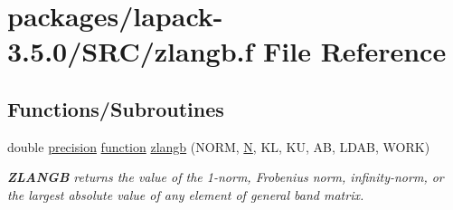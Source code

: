 \hypertarget{zlangb_8f}{}\section{packages/lapack-\/3.5.0/\+S\+R\+C/zlangb.f File Reference}
\label{zlangb_8f}
\subsection*{Functions/\+Subroutines}
\begin{DoxyCompactItemize}
\item 
double \hyperlink{numinquire_8h_a2c8e616467665d0b2814d4c1589ba74e}{precision} \hyperlink{afunc_8m_a7b5e596df91eadea6c537c0825e894a7}{function} \hyperlink{group__complex16GBauxiliary_gad6a0255b5203b49d0f7828f0e03522aa}{zlangb} (N\+O\+R\+M, \hyperlink{polmisc_8c_a0240ac851181b84ac374872dc5434ee4}{N}, K\+L, K\+U, A\+B, L\+D\+A\+B, W\+O\+R\+K)
\begin{DoxyCompactList}\small\item\em {\bfseries Z\+L\+A\+N\+G\+B} returns the value of the 1-\/norm, Frobenius norm, infinity-\/norm, or the largest absolute value of any element of general band matrix. \end{DoxyCompactList}\end{DoxyCompactItemize}
